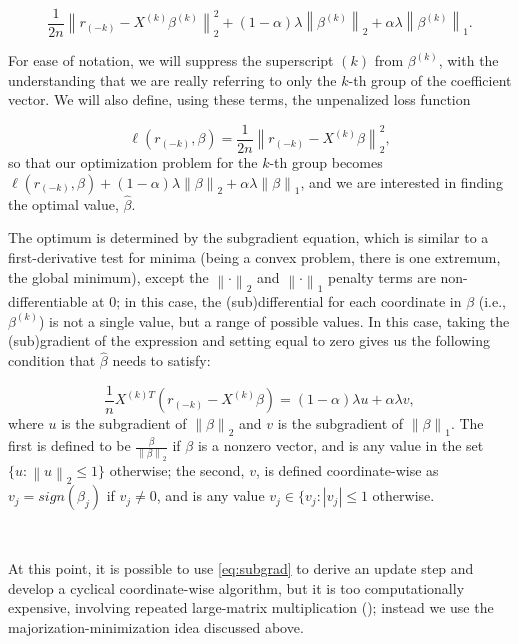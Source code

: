 \documentclass[titlepage]{article}
\newcommand{\norm}[1]{\left\lVert #1 \right\rVert}
\begin{document}
\begin{equation}
	\label{eq:sparsegroupk}
\frac{1}{2n} \norm{r_{(-k)}-X^{(k)}\beta^{(k)}}_2^2 + (1-\alpha)\lambda \norm{\beta^{(k)}}_2 + \alpha \lambda \norm{\beta^{(k)}}_1. 
\end{equation}


For ease of notation, we will suppress the superscript $(k)$ from $\beta^{(k)}$, with the understanding that we are really referring to only the $k$-th group of the coefficient vector. We will also define, using these terms, the unpenalized loss function

\[
\ell (r_{(-k)}, \beta) = \frac{1}{2n}\norm{r_{(-k)} - X^{(k)}\beta}_2^2, 
\]
so that our optimization problem for the $k$-th group becomes $\ell (r_{(-k)},\beta) + (1-\alpha)\lambda\norm{\beta}_2 + \alpha \lambda \norm{\beta}_1$, and we are interested in finding the optimal value, $\hat{\beta}$.

The optimum is determined by the subgradient equation, which is similar to a first-derivative test for minima (being a convex problem, there is one extremum, the global minimum), except the $\norm{\cdot}_2$ and $\norm{\cdot}_1$ penalty terms are non-differentiable at $0$; in this case, the (sub)differential for each coordinate in $\beta$ (i.e., $\beta^{(k)}$) is not a single value, but a range of possible values. In this case, taking the (sub)gradient of the expression and setting equal to zero gives us the following condition that $\hat{\beta}$ needs to satisfy: 

\begin{equation}
  \label{eq:subgrad}
\frac{1}{n}X^{(k)T}(r_{(-k)} - X^{(k)}\beta) = (1-\alpha)\lambda u + \alpha \lambda v,
\end{equation}
where $u$ is the subgradient of $\norm{\beta}_2$ and $v$ is the subgradient of $\norm{\beta}_1$. The first is defined to be $\frac{\beta}{\norm{\beta}_2}$ if $\beta$ is a nonzero vector, and is any value in the set $\{ u : \norm{u}_2 \leq 1 \}$ otherwise; the second, $v$, is defined coordinate-wise as $v_j = sign(\beta_j)$ if $v_j \neq 0$, and is any value $v_j \in \{v_j : |v_j| \leq 1$ otherwise.

\

At this point, it is possible to use \autoref{eq:subgrad} to derive an update step and develop a cyclical coordinate-wise algorithm, but it is too computationally expensive, involving repeated large-matrix multiplication (\citep{simon2013sparse}); instead we use the majorization-minimization idea discussed above.
\end{document}
